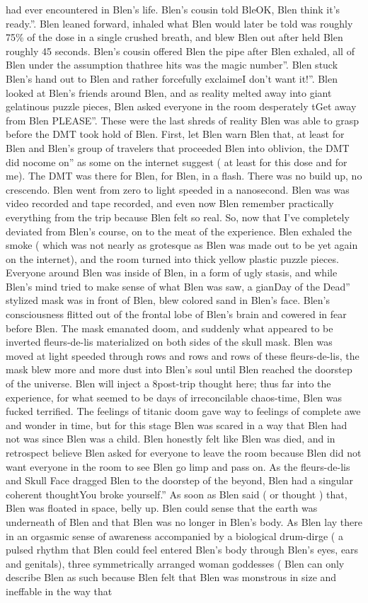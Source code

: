\documentclass[12pt]{book}
\begin{document}
had ever encountered in Blen's life. Blen's cousin told BleOK, Blen think it's ready.''. Blen leaned forward, inhaled what Blen would later be told was roughly 75\% of the dose in a single crushed breath, and blew Blen out after held Blen roughly 45 seconds. Blen's cousin offered Blen the pipe after Blen exhaled, all of Blen under the assumption thathree hits was the magic number''. Blen stuck Blen's hand out to Blen and rather forcefully exclaimeI don't want it!''. Blen looked at Blen's friends around Blen, and as reality melted away into giant gelatinous puzzle pieces, Blen asked everyone in the room desperately tGet away from Blen PLEASE''. These were the last shreds of reality Blen was able to grasp before the DMT took hold of Blen. First, let Blen warn Blen that, at least for Blen and Blen's group of travelers that proceeded Blen into oblivion, the DMT did nocome on'' as some on the internet suggest ( at least for this dose and for me). The DMT was there for Blen, for Blen, in a flash. There was no build up, no crescendo. Blen went from zero to light speeded in a nanosecond. Blen was was video recorded and tape recorded, and even now Blen remember practically everything from the trip because Blen felt so real. So, now that I've completely deviated from Blen's course, on to the meat of the experience. Blen exhaled the smoke ( which was not nearly as grotesque as Blen was made out to be yet again on the internet), and the room turned into thick yellow plastic puzzle pieces. Everyone around Blen was inside of Blen, in a form of ugly stasis, and while Blen's mind tried to make sense of what Blen was saw, a gianDay of the Dead'' stylized mask was in front of Blen, blew colored sand in Blen's face. Blen's consciousness flitted out of the frontal lobe of Blen's brain and cowered in fear before Blen. The mask emanated doom, and suddenly what appeared to be inverted fleurs-de-lis materialized on both sides of the skull mask. Blen was moved at light speeded through rows and rows and rows of these fleurs-de-lis, the mask blew more and more dust into Blen's soul until Blen reached the doorstep of the universe. Blen will inject a 8post-trip thought here; thus far into the experience, for what seemed to be days of irreconcilable chaos-time, Blen was fucked terrified. The feelings of titanic doom gave way to feelings of complete awe and wonder in time, but for this stage Blen was scared in a way that Blen had not was since Blen was a child. Blen honestly felt like Blen was died, and in retrospect believe Blen asked for everyone to leave the room because Blen did not want everyone in the room to see Blen go limp and pass on. As the fleurs-de-lis and Skull Face dragged Blen to the doorstep of the beyond, Blen had a singular coherent thoughtYou broke yourself.'' As soon as Blen said ( or thought ) that, Blen was floated in space, belly up. Blen could sense that the earth was underneath of Blen and that Blen was no longer in Blen's body. As Blen lay there in an orgasmic sense of awareness accompanied by a biological drum-dirge ( a pulsed rhythm that Blen could feel entered Blen's body through Blen's eyes, ears and genitals), three symmetrically arranged woman goddesses ( Blen can only describe Blen as such because Blen felt that Blen was monstrous in size and ineffable in the way that 
\end{document}
